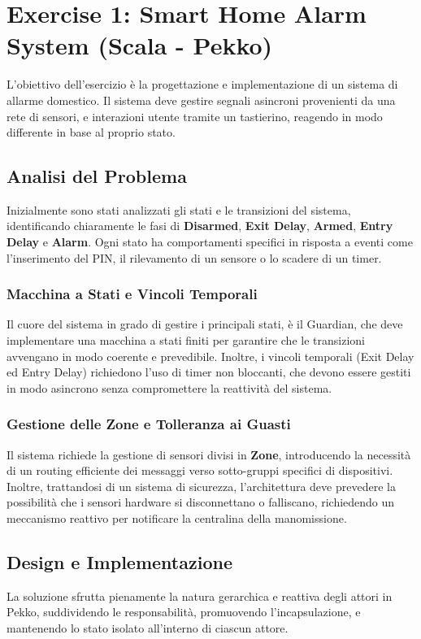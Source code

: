 \section{Exercise 1: Smart Home Alarm System (Scala - Pekko)}
L'obiettivo dell'esercizio è la progettazione e implementazione di un sistema di allarme domestico. Il sistema deve gestire segnali asincroni provenienti da una rete di sensori, e interazioni utente tramite un tastierino, reagendo in modo differente in base al proprio stato.

\subsection{Analisi del Problema}
Inizialmente sono stati analizzati gli stati e le transizioni del sistema, identificando chiaramente le fasi di \textbf{Disarmed}, \textbf{Exit Delay}, \textbf{Armed}, \textbf{Entry Delay} e \textbf{Alarm}. Ogni stato ha comportamenti specifici in risposta a eventi come l'inserimento del PIN, il rilevamento di un sensore o lo scadere di un timer.

\subsubsection{Macchina a Stati e Vincoli Temporali}
Il cuore del sistema in grado di gestire i principali stati, è il Guardian, che deve implementare una macchina a stati finiti per garantire che le transizioni avvengano in modo coerente e prevedibile. Inoltre, i vincoli temporali (Exit Delay ed Entry Delay) richiedono l'uso di timer non bloccanti, che devono essere gestiti in modo asincrono senza compromettere la reattività del sistema.

\subsubsection{Gestione delle Zone e Tolleranza ai Guasti}
Il sistema richiede la gestione di sensori divisi in \textbf{Zone}, introducendo la necessità di un routing efficiente dei messaggi verso sotto-gruppi specifici di dispositivi. Inoltre, trattandosi di un sistema di sicurezza, l'architettura deve prevedere la possibilità che i sensori hardware si disconnettano o falliscano, richiedendo un meccanismo reattivo per notificare la centralina della manomissione.

\newpage
\subsection{Design e Implementazione}
La soluzione sfrutta pienamente la natura gerarchica e reattiva degli attori in Pekko, suddividendo le responsabilità, promuovendo l'incapsulazione, e mantenendo lo stato isolato all'interno di ciascun attore.

